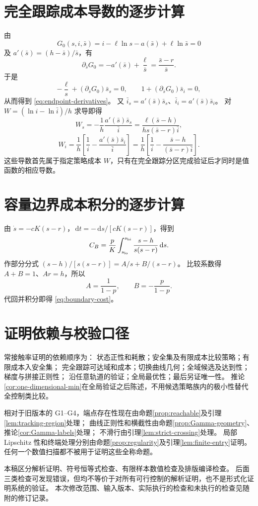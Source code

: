 \documentclass[11pt,a4paper,UTF8]{ctexart}
\theoremstyle{definition}
\newcommand{\dd}{\,\mathrm d}
\begin{document}
\appendix
\section{完全跟踪成本导数的逐步计算}
\label{app:W-derivatives}
由
\[
G_0(s,i,\bar s)=i-\ell\ln s-a(\bar s)+\ell\ln\bar s=0
\]
及 $a'(\bar s)=(h-\bar s)/\bar s$，有
\[
\partial_{\bar s}G_0=-a'(\bar s)+\frac\ell{\bar s}
=\frac{\bar s-r}{\bar s}.
\]
于是
\[
-\frac\ell s+(\partial_{\bar s}G_0)\bar s_s=0,\qquad
1+(\partial_{\bar s}G_0)\bar s_i=0,
\]
从而得到 \eqref{eq:endpoint-derivatives}。
又 $\bar i_s=a'(\bar s)\bar s_s$、$\bar i_i=a'(\bar s)\bar s_i$。
对 $W=(\ln i-\ln\bar i)/h$ 求导即得
\[
W_s=-\frac1h\frac{a'(\bar s)\bar s_s}{\bar i}
=\frac{\ell(\bar s-h)}{hs(\bar s-r)\bar i},
\]
\[
W_i=\frac1h\left[\frac1i-\frac{a'(\bar s)\bar s_i}{\bar i}\right]
=\frac1h\left[\frac1i-\frac{\bar s-h}{(\bar s-r)\bar i}\right].
\]
这些导数首先属于指定策略成本 $W$，只有在完全跟踪分区完成验证后才同时是值函数的相应导数。

\section{容量边界成本积分的逐步计算}
\label{app:capacity-integral}
由 $\dot s=-cK(s-r)$，$\dd t=-\dd s/[cK(s-r)]$，得到
\[
C_B=\frac pK\int_{s_{\rm lo}}^{s_{\rm hi}}\frac{s-h}{s(s-r)}\dd s.
\]
作部分分式 $(s-h)/[s(s-r)]=A/s+B/(s-r)$。
比较系数得 $A+B=1$、$Ar=h$，所以
\[
A=\frac1{1-p},\qquad B=-\frac p{1-p}.
\]
代回并积分即得 \eqref{eq:boundary-cost}。

\section{证明依赖与校验口径}
\label{app:proof-scope}
常接触率证明的依赖顺序为：
状态正性和耗散；安全集及有限成本比较策略；有限成本入安全集；
完全跟踪可达域和成本；切换曲线几何；全域候选及达到性；梯度与拼接正则性；
沿任意轨道的验证；全局最优性；最后另证唯一性。
推论\ref{cor:one-dimensional-min}在全局验证之后陈述，不用候选策略族内的极小性替代全控制类比较。

相对于旧版本的 G1--G4，端点存在性现在由命题\ref{prop:reachable}及引理\ref{lem:tracking-region}处理；
曲线正则性和横截性由命题\ref{prop:Gamma-geometry}、推论\ref{cor:Gamma-labels}处理；
不滑行由引理\ref{lem:strict-crossing}处理。
局部 Lipschitz 性和终端处理分别由命题\ref{prop:regularity}及引理\ref{lem:finite-entry}证明。
任何一个数值扫描都不被用于证明这些全称命题。

本稿区分解析证明、符号恒等式检查、有限样本数值检查及排版编译检查。
后面三类检查可发现错误，但均不等价于对所有可行控制的解析证明，也不是形式化证明系统的验证。
本次修改范围、输入版本、实际执行的检查和未执行的检查见随附的修订记录。
\end{document}
